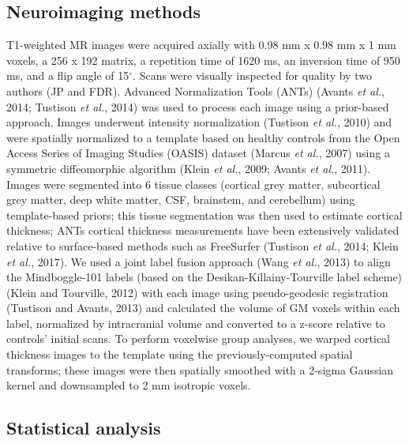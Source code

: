 \documentclass[]{article}
\begin{document}
\subsection*{Neuroimaging methods}\label{neuroimaging-methods}

T1-weighted MR images were acquired axially with 0.98 mm x 0.98 mm x 1
mm voxels, a 256 x 192 matrix, a repetition time of 1620 ms, an
inversion time of 950 ms, and a flip angle of 15\(^\circ\). Scans were
visually inspected for quality by two authors (JP and FDR). Advanced
Normalization Tools (ANTs) (Avants \emph{et al.}, 2014; Tustison
\emph{et al.}, 2014) was used to process each image using a prior-based
approach. Images underwent intensity normalization (Tustison \emph{et
al.}, 2010) and were spatially normalized to a template based on healthy
controls from the Open Access Series of Imaging Studies (OASIS) dataset
(Marcus \emph{et al.}, 2007) using a symmetric diffeomorphic algorithm
(Klein \emph{et al.}, 2009; Avants \emph{et al.}, 2011). Images were
segmented into 6 tissue classes (cortical grey matter, subcortical grey
matter, deep white matter, CSF, brainstem, and cerebellum) using
template-based priors; this tissue segmentation was then used to
estimate cortical thickness; ANTs cortical thickness measurements have
been extensively validated relative to surface-based methods such as
FreeSurfer (Tustison \emph{et al.}, 2014; Klein \emph{et al.}, 2017). We
used a joint label fusion approach (Wang \emph{et al.}, 2013) to align
the Mindboggle-101 labels (based on the Desikan-Killainy-Tourville label
scheme) (Klein and Tourville, 2012) with each image using
pseudo-geodesic registration (Tustison and Avants, 2013) and calculated
the volume of GM voxels within each label, normalized by intracranial
volume and converted to a z-score relative to controls' initial scans.
To perform voxelwise group analyses, we warped cortical thickness images
to the template using the previously-computed spatial transforms; these
images were then spatially smoothed with a 2-sigma Gaussian kernel and
downsampled to 2 mm isotropic voxels.

\subsection*{Statistical analysis}\label{statistical-analysis}
\end{document}
